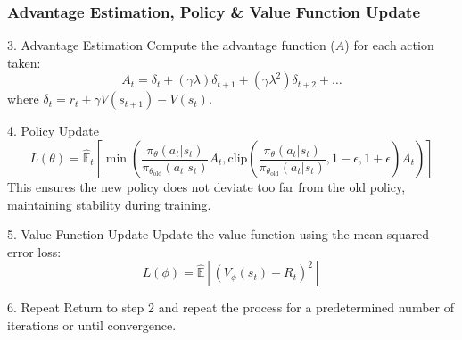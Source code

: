 \documentclass{beamer}
\begin{document}
\begin{frame}[fragile]
    \frametitle{Advantage Estimation, Policy & Value Function Update}

    \begin{block}{3. Advantage Estimation}
        Compute the advantage function ($A$) for each action taken:
        \begin{equation}
            A_t = \delta_t + (\gamma \lambda) \delta_{t+1} + (\gamma \lambda^2) \delta_{t+2} + \ldots
        \end{equation}
        where $\delta_t = r_t + \gamma V(s_{t+1}) - V(s_t)$.
    \end{block}

    \begin{block}{4. Policy Update}
        \begin{equation}
            L(\theta) = \hat{\mathbb{E}}_t \left[\min\left(\frac{\pi_\theta(a_t | s_t)}{\pi_{\theta_{\text{old}}}(a_t | s_t)} A_t, \text{clip}\left(\frac{\pi_\theta(a_t | s_t)}{\pi_{\theta_{\text{old}}}(a_t | s_t)}, 1 - \epsilon, 1 + \epsilon\right) A_t\right)\right]
        \end{equation}
        This ensures the new policy does not deviate too far from the old policy, maintaining stability during training.
    \end{block}

    \begin{block}{5. Value Function Update}
        Update the value function using the mean squared error loss:
        \begin{equation}
            L(\phi) = \hat{\mathbb{E}} \left[(V_\phi(s_t) - R_t)^2\right]
        \end{equation}
    \end{block}

    \begin{block}{6. Repeat}
        Return to step 2 and repeat the process for a predetermined number of iterations or until convergence.
    \end{block}
\end{frame}
\end{document}
